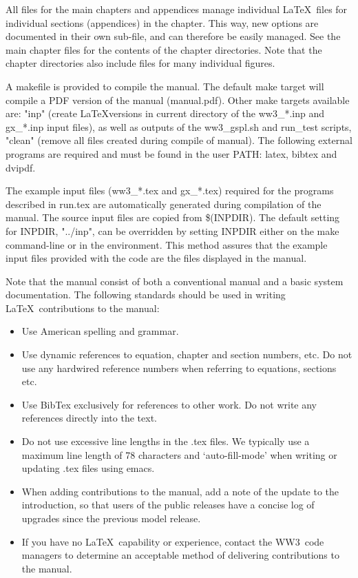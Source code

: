 \documentclass[12pt]{article}
\newcommand{\ws}{WW3}
\newcommand{\file}{\sf}
\newcommand{\pb}{\strut \vfill \pagebreak}
\begin{document}
\vspace{\baselineskip} \noindent All files for the main chapters and
appendices manage individual \LaTeX\ files for individual sections
(appendices) in the chapter. This way, new options are documented in their own
sub-file, and can therefore be easily managed. See the main chapter files for
the contents of the chapter directories. Note that the chapter directories
also include files for many individual figures.

\vspace{\baselineskip} \noindent A {\file makefile} is provided to compile the
manual.  The default make target will compile a PDF version of the manual
(manual.pdf).  Other make targets available are: "inp" (create \LaTeX versions
in current directory of the {\file ww3\_*.inp} and {\file gx\_*.inp} input
files), as well as outputs of the {\file ww3\_gspl.sh} and {\file run\_test}
scripts, "clean" (remove all files created during compile of manual).  The
following external programs are required and must be found in the user PATH:
{\file latex}, {\file bibtex} and {\file dvipdf}.

\vspace{\baselineskip} \noindent The example input files ({\file ww3\_*.tex}
and {\file gx\_*.tex}) required for the programs described in {\file run.tex}
are automatically generated during compilation of the manual. The source input
files are copied from {\file \$(INPDIR)}.  The default setting for {\file
  INPDIR}, "../inp", can be overridden by setting {\file INPDIR} either on the
make command-line or in the environment. This method assures that the example
input files provided with the code are the files displayed in the manual.

\pb \noindent Note that the manual consist of both a conventional manual and a
basic system documentation. The following standards should be used in writing
\LaTeX\ contributions to the manual:

\begin{itemize}
\item Use American spelling and grammar.
\item Use dynamic references to equation, chapter and section numbers, etc. Do
      not use any hardwired reference numbers when referring to equations,
      sections etc.
\item Use BibTex exclusively for references to other work. Do not write any
      references directly into the text.
\item Do not use excessive line lengths in the {\file .tex} files. We
      typically use a maximum line length of 78 characters and
      `auto-fill-mode' when writing or updating {\file .tex} files using
      emacs. 
\item When adding contributions to the manual, add a note of the
      update to the introduction, so that users of the public releases
      have a concise log of upgrades since the previous model release.
\item If you have no \LaTeX\ capability or experience, contact the \ws\ code
      managers to determine an acceptable method of delivering contributions
      to the manual.
\end{itemize}
\end{document}
